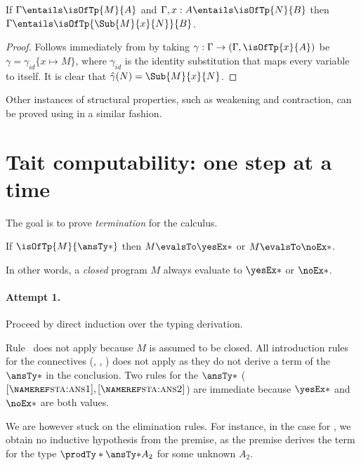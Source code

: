 \documentclass[letterpaper]{article}
\begin{document}
\begin{corollary}
If $\Gamma \entails \isOfTp{M}{A}$ and $\Gamma, x : A \entails \isOfTp{N}{B}$ then $\Gamma \entails \isOfTp{\Sub{M}{x}{N}}{B}$.
\end{corollary}

\begin{proof}
  Follows immediately from  by taking $\gamma : \Gamma \to (\Gamma, \isOfTp{x}{A})$ be $\gamma = \gamma_{id}\{x \mapsto M\}$, where $\gamma_{id}$ is the identity substitution that maps every variable to itself. It is clear that $\hat{\gamma}(N) = \Sub{M}{x}{N}$.
\end{proof}

Other instances of structural properties, such as weakening and contraction, can be proved using  in a similar fashion.

\section{Tait computability: one step at a time}\label{sec:standard}

The goal is to prove \emph{termination} for the calculus.

\begin{theorem}
If $\isOfTp{M}{\ansTy*}$ then $M \evalsTo \yesEx*$ or $M \evalsTo \noEx*$.
\end{theorem}

In other words, a \emph{closed} program $M$ always evaluate to $\yesEx*$ or $\noEx*$.

\paragraph{Attempt 1.} Proceed by direct induction over the typing derivation.

Rule~ does not apply because $M$ is assumed to be closed. All introduction
rules for the connectives (, , )
does not apply as they do not derive a term of the $\ansTy*$ in the conclusion. Two
rules for the $\ansTy*$ ($\ruleref{sta:ans1}, \ruleref{sta:ans2}$) are immediate because
$\yesEx*$ and $\noEx*$ are both values.

We are however stuck on the elimination rules. For instance, in the case for ,
we obtain no inductive hypothesis from the premise, as the premise derives the term for the
type $\prodTy*{\ansTy*}{A_2}$ for some unknown $A_2$.
\end{document}
